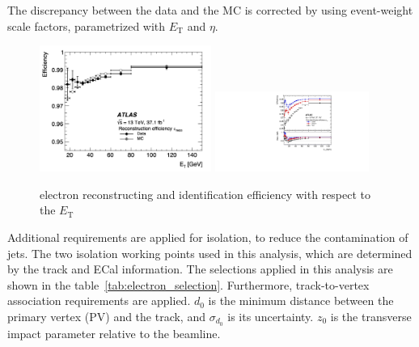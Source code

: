 The discrepancy between the data and the MC is corrected by using event-weight scale factors, parametrized with $E_\mathrm{T}$ and $\eta$.
\begin{figure}[tbp]
\begin{center}
 \includegraphics[width=0.50\textwidth,keepaspectratio]{figures/Reconstruction/recoElectron}
 \includegraphics[width=0.45\textwidth,keepaspectratio]{figures/Reconstruction/idElectron}
\caption{
electron reconstructing and identification efficiency with respect to the $E_\mathrm{T}$
}
\label{fig:recoElectron}
\end{center}
\end{figure}
Additional requirements are applied for isolation, to reduce the contamination of jets. 
The two isolation working points used in this analysis, which are determined by the track and ECal information. 
The selections applied in this analysis are shown in the table~\ref{tab:electron_selection}.
Furthermore, track-to-vertex association requirements are applied. 
$d_0$ is the minimum distance between the primary vertex (PV) and the track, and $\sigma_{d_0}$ is its uncertainty. $z_0$ is the transverse impact parameter relative to the beamline.
